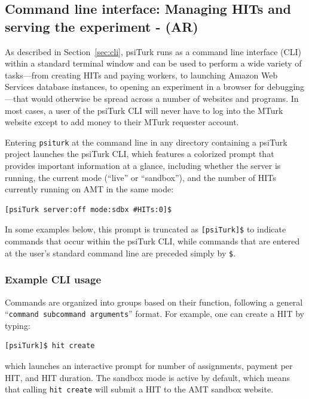 \documentclass[twocolumn]{svjour3}          %
\newcommand{\psiturk}[0]{\textsf{psiTurk}}
\begin{document}
\subsection{Command line interface: Managing HITs and serving the experiment - (AR)}

As described in Section~\ref{sec:cli}, \psiturk{} runs as a command line interface
(CLI) within a standard terminal window and can be used to perform a wide
variety of tasks---from creating HITs and paying workers, to launching Amazon
Web Services database instances, to opening an experiment in a browser for
debugging---that would otherwise be spread across a number of websites and
programs. In most cases, a user of the \psiturk{} CLI will never have to log into
the MTurk website except to add money to their MTurk requester account.

Entering
\texttt{psiturk} at the command line in any directory containing a \psiturk{} project launches the
\psiturk{} CLI, whieh features a colorized prompt that provides important information at a glance, including
whether the server is running, the current mode (``live'' or ``sandbox''), and the number of HITs currently running on AMT in the same mode:

\begin{lstlisting}
[psiTurk server:off mode:sdbx #HITs:0]$
\end{lstlisting}

\noindent In some examples below, this prompt is truncated as \texttt{[psiTurk]\$} to indicate commands that occur within the \psiturk{} CLI, while commands that are entered at the user's standard command line are preceded simply by \texttt{\$}.

\subsubsection{Example CLI usage}
Commands are organized into groups based on their function, following a general ``\texttt{command subcommand
arguments}'' format. For example, one can create a HIT by typing: 

\begin{lstlisting}
[psiTurk]$ hit create
\end{lstlisting}

\noindent which launches an interactive prompt for number of assignments, payment per HIT, and HIT duration. The sandbox mode is active by default, which means that calling \texttt{hit create} will submit a HIT to the AMT sandbox website.
\end{document}
